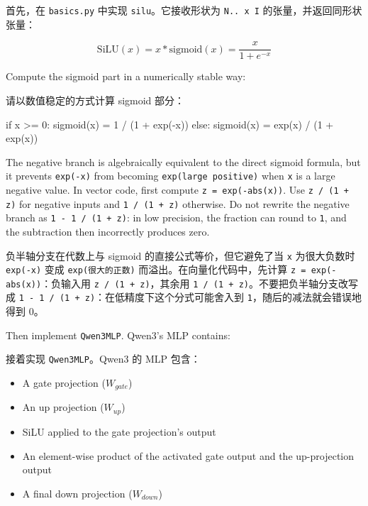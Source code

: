 \documentclass[11pt,a4paper]{article}
\newenvironment{zhpar}{%
  \par\smallskip\begingroup\color{zhcolor}\small\ignorespaces%
}{\endgroup\par\smallskip}
\begin{document}
\begin{zhpar}
首先，在 \texttt{basics.py} 中实现 \texttt{silu}。它接收形状为 \texttt{N.. x I} 的张量，并返回同形状张量：
\end{zhpar}
\[
\text{SiLU}(x) = x * \text{sigmoid}(x) = \frac{x}{1 + e^{-x}}
\]

Compute the sigmoid part in a numerically stable way:

\begin{zhpar}
请以数值稳定的方式计算 sigmoid 部分：
\end{zhpar}
\begin{codeblock}
if x >= 0:
    sigmoid(x) = 1 / (1 + exp(-x))
else:
    sigmoid(x) = exp(x) / (1 + exp(x))
\end{codeblock}

The negative branch is algebraically equivalent to the direct sigmoid formula, but it prevents \texttt{exp(-x)} from becoming \texttt{exp(large positive)} when \texttt{x} is a large negative value. In vector code, first compute \texttt{z = exp(-abs(x))}. Use \texttt{z / (1 + z)} for negative inputs and \texttt{1 / (1 + z)} otherwise. Do not rewrite the negative branch as \texttt{1 - 1 / (1 + z)}: in low precision, the fraction can round to \texttt{1}, and the subtraction then incorrectly produces zero.

\begin{zhpar}
负半轴分支在代数上与 sigmoid 的直接公式等价，但它避免了当 \texttt{x} 为很大负数时 \texttt{exp(-x)} 变成 \texttt{exp(很大的正数)} 而溢出。在向量化代码中，先计算 \texttt{z = exp(-abs(x))}：负输入用 \texttt{z / (1 + z)}，其余用 \texttt{1 / (1 + z)}。不要把负半轴分支改写成 \texttt{1 - 1 / (1 + z)}：在低精度下这个分式可能舍入到 \texttt{1}，随后的减法就会错误地得到 0。
\end{zhpar}
Then implement \texttt{Qwen3MLP}. Qwen3's MLP contains:

\begin{zhpar}
接着实现 \texttt{Qwen3MLP}。Qwen3 的 MLP 包含：
\end{zhpar}
\begin{itemize}[leftmargin=1.6em,itemsep=0.15em,parsep=0pt]
\item A gate projection ($W_{gate}$)
\item An up projection ($W_{up}$)
\item SiLU applied to the gate projection's output
\item An element-wise product of the activated gate output and the up-projection output
\item A final down projection ($W_{down}$)
\end{itemize}
\end{document}
